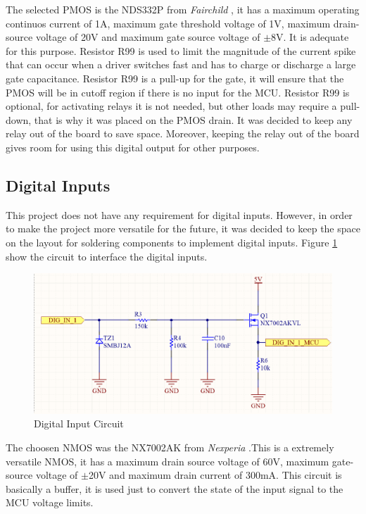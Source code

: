			The selected PMOS is the NDS332P from \textit{Fairchild} \cite{nds332p-datasheet}, it has a maximum operating continuos current of 1A, maximum gate threshold voltage of 1V, maximum drain-source voltage of 20V and maximum gate source voltage of $\pm$8V. It is adequate for this purpose. Resistor R99 is used to limit the magnitude of the current spike that can occur when a driver switches fast and has to charge or discharge a large gate capacitance. Resistor R99 is a pull-up for the gate, it will ensure that the PMOS will be in cutoff region if there is no input for the MCU. Resistor R99 is optional, for activating relays it is not needed, but other loads may require a pull-down, that is why it was placed on the PMOS drain. It was decided to keep any relay out of the board to save space. Moreover, keeping the relay out of the board gives room for using this digital output for other purposes.

	\subsection{Digital Inputs}\label{ssec:digital-inputs}

		This project does not have any requirement for digital inputs. However, in order to make the project more versatile for the future, it was decided to keep the space on the layout for soldering components to implement digital inputs. Figure \ref{fig:digital-input-circuit} show the circuit to interface the digital inputs.

			\begin{figure}[htbp]
				\centering
				\includegraphics[scale=0.7]{figuras/fig-digital-input-circuit.png}
				\caption{Digital Input Circuit \cite{digital-input-circuit}}
				\label{fig:digital-input-circuit}
			\end{figure}

		The choosen NMOS was the NX7002AK from \textit{Nexperia} \cite{nx7002ak-datasheet}.This is a extremely versatile NMOS, it has a maximum drain source voltage of 60V, maximum gate-source voltage of $\pm$20V and maximum drain current of 300mA. This circuit is basically a buffer, it is used just to convert the state of the input signal to the MCU voltage limits. 

